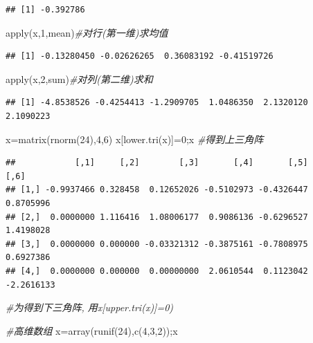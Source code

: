 \documentclass[
]{book}
\newenvironment{Shaded}{\begin{snugshade}}{\end{snugshade}}
\newcommand{\CommentTok}[1]{\textcolor[rgb]{0.56,0.35,0.01}{\textit{#1}}}
\newcommand{\DecValTok}[1]{\textcolor[rgb]{0.00,0.00,0.81}{#1}}
\newcommand{\FunctionTok}[1]{\textcolor[rgb]{0.00,0.00,0.00}{#1}}
\newcommand{\NormalTok}[1]{#1}
\newcommand{\OtherTok}[1]{\textcolor[rgb]{0.56,0.35,0.01}{#1}}
\begin{document}
\begin{verbatim}
## [1] -0.392786
\end{verbatim}

\begin{Shaded}
\begin{Highlighting}[]
\FunctionTok{apply}\NormalTok{(x,}\DecValTok{1}\NormalTok{,mean)}\CommentTok{\#对行(第一维)求均值}
\end{Highlighting}
\end{Shaded}

\begin{verbatim}
## [1] -0.13280450 -0.02626265  0.36083192 -0.41519726
\end{verbatim}

\begin{Shaded}
\begin{Highlighting}[]
\FunctionTok{apply}\NormalTok{(x,}\DecValTok{2}\NormalTok{,sum)}\CommentTok{\#对列(第二维)求和}
\end{Highlighting}
\end{Shaded}

\begin{verbatim}
## [1] -4.8538526 -0.4254413 -1.2909705  1.0486350  2.1320120  2.1090223
\end{verbatim}

\begin{Shaded}
\begin{Highlighting}[]
\NormalTok{x}\OtherTok{=}\FunctionTok{matrix}\NormalTok{(}\FunctionTok{rnorm}\NormalTok{(}\DecValTok{24}\NormalTok{),}\DecValTok{4}\NormalTok{,}\DecValTok{6}\NormalTok{)}
\NormalTok{x[}\FunctionTok{lower.tri}\NormalTok{(x)]}\OtherTok{=}\DecValTok{0}\NormalTok{;x }\CommentTok{\#得到上三角阵}
\end{Highlighting}
\end{Shaded}

\begin{verbatim}
##            [,1]     [,2]        [,3]       [,4]       [,5]       [,6]
## [1,] -0.9937466 0.328458  0.12652026 -0.5102973 -0.4326447  0.8705996
## [2,]  0.0000000 1.116416  1.08006177  0.9086136 -0.6296527  1.4198028
## [3,]  0.0000000 0.000000 -0.03321312 -0.3875161 -0.7808975  0.6927386
## [4,]  0.0000000 0.000000  0.00000000  2.0610544  0.1123042 -2.2616133
\end{verbatim}

\begin{Shaded}
\begin{Highlighting}[]
\CommentTok{\#为得到下三角阵, 用x[upper.tri(x)]=0)}

\CommentTok{\#高维数组}
\NormalTok{x}\OtherTok{=}\FunctionTok{array}\NormalTok{(}\FunctionTok{runif}\NormalTok{(}\DecValTok{24}\NormalTok{),}\FunctionTok{c}\NormalTok{(}\DecValTok{4}\NormalTok{,}\DecValTok{3}\NormalTok{,}\DecValTok{2}\NormalTok{));x}
\end{Highlighting}
\end{Shaded}
\end{document}

